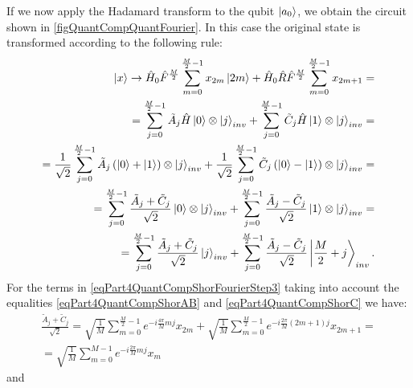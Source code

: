 

If we now apply the Hadamard transform 
to the qubit
$\ket{a_0}$, we obtain the circuit shown in
\autoref{figQuantCompQuantFourier}. In this case the original state
is transformed according to the following rule:
\begin{eqnarray}
\ket{x} \rightarrow
\hat{H}_0\hat{F}^{\frac{M}{2}} \sum_{m = 0}^{\frac{M}{2} - 1}x_{2m} \ket{2m} +
\hat{H}_0\hat{R}\hat{F}^{\frac{M}{2}}\sum_{m = 0}^{\frac{M}{2} - 1} x_{2m + 1} =
\nonumber \\
=
\sum_{j = 0}^{\frac{M}{2} - 1}
\tilde{A}_{j}
\hat{H}\ket{0} \otimes \ket{j}_{inv}
+
\sum_{j = 0}^{\frac{M}{2} - 1} 
\tilde{C}_{j}
\hat{H}\ket{1} \otimes \ket{j}_{inv} 
=
\nonumber \\
= 
\frac{1}{\sqrt{2}}\sum_{j = 0}^{\frac{M}{2} - 1}
\tilde{A}_{j} 
\left(\ket{0} + \ket{1} \right) \otimes  
\ket{j}_{inv}
+
\frac{1}{\sqrt{2}}\sum_{j = 0}^{\frac{M}{2} - 1}
\tilde{C}_{j} 
\left(\ket{0} - \ket{1} \right) \otimes  
\ket{j}_{inv}
=
\nonumber \\
=
\sum_{j = 0}^{\frac{M}{2} - 1}
\frac{\tilde{A}_{j} + \tilde{C}_{j} }{\sqrt{2}} 
\ket{0} \otimes \ket{j}_{inv} +
\sum_{j = 0}^{\frac{M}{2} - 1}
\frac{ \tilde{A}_{j} - \tilde{C}_{j}}{\sqrt{2}} 
\ket{1} \otimes \ket{j}_{inv}
=
\nonumber \\
=
\sum_{j = 0}^{\frac{M}{2} - 1}
\frac{\tilde{A}_{j} + \tilde{C}_{j} }{\sqrt{2}} \ket{j}_{inv} +
\sum_{j = 0}^{\frac{M}{2} - 1}
\frac{ \tilde{A}_{j} - \tilde{C}_{j}}{\sqrt{2}} 
\left|\frac{M}{2} + j \right>_{inv}.
\label{eqPart4QuantCompShorFourierStep3}
\end{eqnarray}
For the terms in \eqref{eqPart4QuantCompShorFourierStep3} taking into account the equalities
\eqref{eqPart4QuantCompShorAB} and \eqref{eqPart4QuantCompShorC} we have:
\begin{eqnarray}
\frac{\tilde{A}_{j} + \tilde{C}_{j} }{\sqrt{2}} = 
\sqrt{\frac{1}{M}} 
\sum_{m = 0}^{\frac{M}{2} - 1} e^{-i \frac{4 \pi}{M} m j} x_{2m}  +
\sqrt{\frac{1}{M}} 
\sum_{m = 0}^{\frac{M}{2} - 1} 
e^{-i \frac{2 \pi}{M} \left(2m+1\right) j} x_{2m+1} = 
\nonumber \\
=
\sqrt{\frac{1}{M}} \sum_{m = 0}^{M - 1}
e^{-i \frac{2 \pi}{M} m j} x_{m}
\label{eqPart4QuantCompShorFourierStep3_1}
\end{eqnarray}
and
